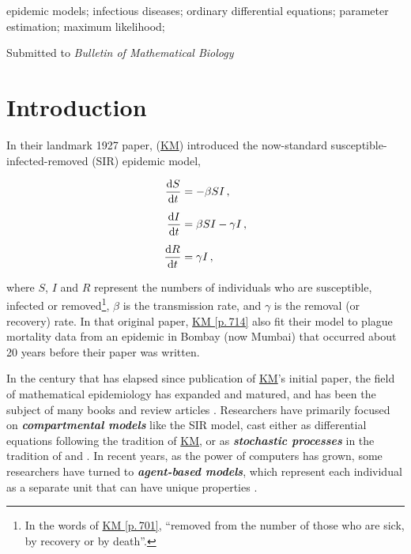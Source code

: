 \documentclass[]{interact}\usepackage[]{graphicx}\usepackage[]{xcolor}
\theoremstyle{plain}%
\theoremstyle{definition}
\theoremstyle{remark}
\newcommand{\term}[1]{{\bfseries\slshape#1}}
\newcommand{\dee}{{\rm d}}
\newcommand{\dd}[2]{{\frac{\dee{#1}}{\dee{#2}}}}
\newcommand{\ddt}[1]{\dd{#1}{t}}
\newcommand{\KM}{\protect\hyperlink{cite.KermMcKe27}{KM}\xspace}
\newcommand{\KMpage}[1]{\protect\hyperlink{cite.KermMcKe27}{KM [p.\,#1]}\xspace}
\newcommand{\code}[1]{\texttt{\detokenize{#1}}}
\begin{document}
\begin{keywords}
  epidemic models; infectious diseases; ordinary differential
  equations; parameter estimation; maximum likelihood; \code{fitode}
\end{keywords}

Submitted to \emph{Bulletin of Mathematical Biology}

\section{Introduction}

In their landmark 1927 paper, \citet[p.\,713]{KermMcKe27} (\KM)
introduced the now-standard susceptible-infected-removed (SIR)
epidemic model,
\begin{linenomath*}
  \begin{subequations}\label{eq:SIR}
    \begin{align}
      \ddt{S} &= -\beta S I \,, \label{eq:SIR;S} \\
      \noalign{\vspace{5pt}}
      \ddt{I} &= \beta S I - \gamma I \,, \label{eq:SIR;I}\\
      \noalign{\vspace{5pt}}
      \ddt{R} &= \gamma I\,, \label{eq:SIR;R}
    \end{align}
  \end{subequations}
\end{linenomath*}
where $S$, $I$ and $R$ represent the numbers of individuals who are
susceptible, infected or removed\footnote{In the words of
  \KMpage{701}, ``removed from the number of those who are sick, by
  recovery or by death''.}, $\beta$ is the transmission rate, and
$\gamma$ is the removal (or recovery) rate.  In that original paper,
\KMpage{714} also fit their model to plague mortality data from an
epidemic in Bombay (now Mumbai) that occurred about 20 years before
their paper was written.

In the century that has elapsed since publication of \KM's initial
paper, the field of mathematical epidemiology has expanded and
matured, and has been the subject of many books
\citep{Bart60,Bail75,AndeMay91,AndeBrit00b,DiekHees00,BrauCast01,Brau+19}
and review articles \citep{Heth00,Earn+02,Earn08,Earn09}.  Researchers
have primarily focused on \term{compartmental models} like the SIR
model, cast either as differential equations following the tradition
of \KM, or as \term{stochastic processes} in the
tradition of \citet{McKe26} and \citet{Bart60}.  In
recent years, as the power of computers has grown, some researchers
have turned to \term{agent-based models}, which represent each
individual as a separate unit that can have unique properties
\citep{eubank2004modelling}.
\end{document}
